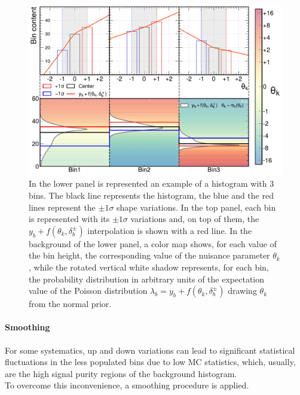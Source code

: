 \begin{figure}[h!]
    \centering
    \includegraphics[width=\linewidth]{fig//chap05-stats/morphing.pdf}
    \caption{In the lower panel is represented an example of a histogram with 3 bins. The black line represents the histogram, the blue and the red lines represent the $\pm 1 \sigma$ shape variations.
    In the top panel, each bin is represented with its $\pm 1 \sigma$ variations and, on top of them, the $y_b+f(\theta_k,\delta_b^\pm)$ interpolation is shown with a red line. In the background of the lower panel, a color map shows, for each value of the bin height, the corresponding value of the nuisance parameter $\theta_k$, while the rotated vertical white shadow represents, for each bin, the probability distribution in arbitrary units of the expectation value of the Poisson distribution $\lambda_b=y_b+f(\theta_k,\delta_b^\pm)$ drawing $\theta_k$ from the normal prior.}
    \label{fig:morphing}
\end{figure}
\newpage
\vspace{0.5cm}
\paragraph*{Smoothing}
For some systematics, up and down variations can lead to significant statistical fluctuations in the less populated bins due to low MC statistics, which, usually, are the high signal purity regions of the background histogram.\\
To overcome this inconvenience, a smoothing procedure is applied.

